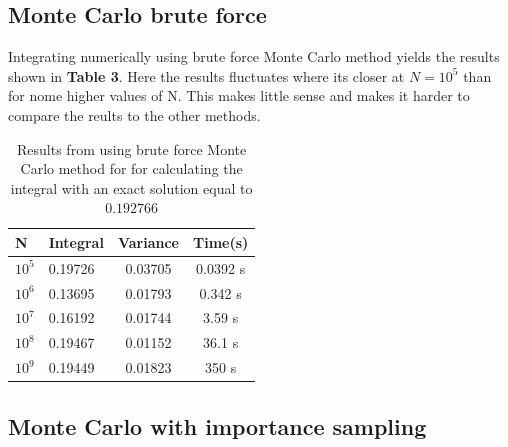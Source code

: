 \documentclass[twoside,twocolumn]{article}
\begin{document}
\subsection{Monte Carlo brute force}
Integrating numerically using brute force Monte Carlo method yields the results shown in \textbf{Table 3}. Here the results fluctuates where its closer at $N = 10^5$ than for nome higher values of N. This makes little sense and makes it harder to compare the reults to the other methods. 
\begin{table}[h]
\centering
\begin{tabular}{|l|l|c|c|}
\hline
N                     & Integral & \multicolumn{1}{l|}{Variance} & Time(s)  \\ \hline
$10^5$ & 0.19726  & 0.03705                       & 0.0392 s \\ \hline
$10^6$ & 0.13695  & 0.01793                       & 0.342 s  \\ \hline
$10^7$ & 0.16192  & 0.01744                       & 3.59 s   \\ \hline
$10^8$ &0.19467  & 0.01152                       & 36.1 s   \\ \hline
$10^9$ & 0.19449  & 0.01823                       & 350 s    \\ \hline
\end{tabular}
\caption{Results from using brute force Monte Carlo method for for calculating the integral with an exact solution equal to $0.192766$}
\end{table}

\subsection{Monte Carlo with importance sampling}
\end{document}
